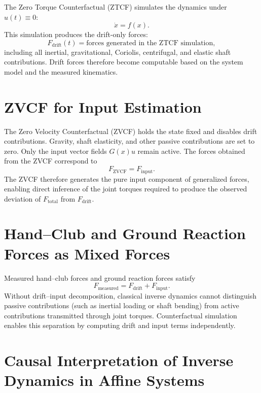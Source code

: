 \documentclass[12pt]{article}
\begin{document}
The Zero Torque Counterfactual (ZTCF) simulates the dynamics under $u(t) \equiv 0$:
\begin{equation}
\dot{x} = f(x).
\end{equation}
This simulation produces the drift-only forces:
\begin{equation}
F_{\mathrm{drift}}(t) = \text{forces generated in the ZTCF simulation},
\end{equation}
including all inertial, gravitational, Coriolis, centrifugal, and elastic shaft contributions. Drift forces therefore become computable based on the system model and the measured kinematics.

\section{ZVCF for Input Estimation}

The Zero Velocity Counterfactual (ZVCF) holds the state fixed and disables drift contributions. Gravity, shaft elasticity, and other passive contributions are set to zero. Only the input vector fields $G(x)u$ remain active. The forces obtained from the ZVCF correspond to
\begin{equation}
F_{\mathrm{ZVCF}} = F_{\mathrm{input}}.
\end{equation}
The ZVCF therefore generates the pure input component of generalized forces, enabling direct inference of the joint torques required to produce the observed deviation of $F_{\mathrm{total}}$ from $F_{\mathrm{drift}}$.

\section{Hand--Club and Ground Reaction Forces as Mixed Forces}

Measured hand--club forces and ground reaction forces satisfy
\begin{equation}
F_{\mathrm{measured}} = F_{\mathrm{drift}} + F_{\mathrm{input}}.
\end{equation}
Without drift--input decomposition, classical inverse dynamics cannot distinguish passive contributions (such as inertial loading or shaft bending) from active contributions transmitted through joint torques. Counterfactual simulation enables this separation by computing drift and input terms independently.

\section{Causal Interpretation of Inverse Dynamics in Affine Systems}
\end{document}

